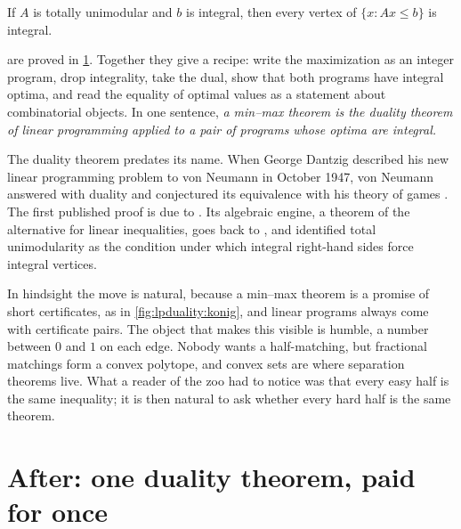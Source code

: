 \begin{refsection}
\begin{theorem}[Integrality]\label{thm:lpduality:integrality}
If $A$ is totally unimodular and $b$ is integral, then every vertex of $\{x:Ax\le b\}$ is integral.
\end{theorem}

 are proved in \cref{sec:lpduality:paid}. Together they give a recipe: write the maximization as an integer program, drop integrality, take the dual, show that both programs have integral optima, and read the equality of optimal values as a statement about combinatorial objects. In one sentence, \emph{a min--max theorem is the duality theorem of linear programming applied to a pair of programs whose optima are integral.}

The duality theorem predates its name. When George Dantzig described his new linear programming problem to von Neumann in October 1947, von Neumann answered with duality and conjectured its equivalence with his theory of games \parencite{Dantzig1982,vonStengel2024}. The first published proof is due to \textcite{GaleKuhnTucker1951}. Its algebraic engine, a theorem of the alternative for linear inequalities, goes back to \textcite{Farkas1902}, and \textcite{HoffmanKruskal1956} identified total unimodularity as the condition under which integral right-hand sides force integral vertices.

In hindsight the move is natural, because a min--max theorem is a promise of short certificates, as in \cref{fig:lpduality:konig}, and linear programs always come with certificate pairs. The object that makes this visible is humble, a number between $0$ and $1$ on each edge. Nobody wants a half-matching, but fractional matchings form a convex polytope, and convex sets are where separation theorems live. What a reader of the zoo had to notice was that every easy half is the same inequality; it is then natural to ask whether every hard half is the same theorem.

\section{After: one duality theorem, paid for once}\label{sec:lpduality:paid}


\end{refsection}
